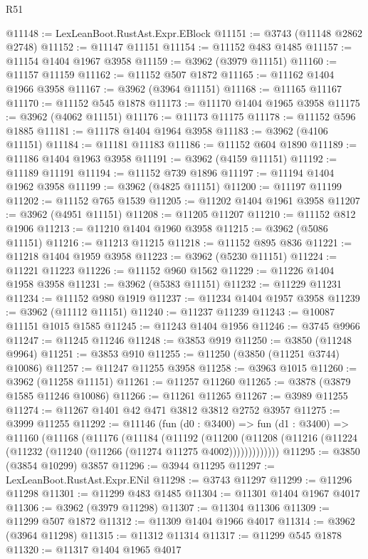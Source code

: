\begin{lexlean}{R51}
\begin{coremodule}
@11148 := LexLeanBoot.RustAst.Expr.EBlock
@11151 := @3743 (@11148 @2862 @2748)
@11152 := @11147 @11151
@11154 := @11152 @483 @1485
@11157 := @11154 @1404 @1967 @3958
@11159 := @3962 (@3979 @11151)
@11160 := @11157 @11159
@11162 := @11152 @507 @1872
@11165 := @11162 @1404 @1966 @3958
@11167 := @3962 (@3964 @11151)
@11168 := @11165 @11167
@11170 := @11152 @545 @1878
@11173 := @11170 @1404 @1965 @3958
@11175 := @3962 (@4062 @11151)
@11176 := @11173 @11175
@11178 := @11152 @596 @1885
@11181 := @11178 @1404 @1964 @3958
@11183 := @3962 (@4106 @11151)
@11184 := @11181 @11183
@11186 := @11152 @604 @1890
@11189 := @11186 @1404 @1963 @3958
@11191 := @3962 (@4159 @11151)
@11192 := @11189 @11191
@11194 := @11152 @739 @1896
@11197 := @11194 @1404 @1962 @3958
@11199 := @3962 (@4825 @11151)
@11200 := @11197 @11199
@11202 := @11152 @765 @1539
@11205 := @11202 @1404 @1961 @3958
@11207 := @3962 (@4951 @11151)
@11208 := @11205 @11207
@11210 := @11152 @812 @1906
@11213 := @11210 @1404 @1960 @3958
@11215 := @3962 (@5086 @11151)
@11216 := @11213 @11215
@11218 := @11152 @895 @836
@11221 := @11218 @1404 @1959 @3958
@11223 := @3962 (@5230 @11151)
@11224 := @11221 @11223
@11226 := @11152 @960 @1562
@11229 := @11226 @1404 @1958 @3958
@11231 := @3962 (@5383 @11151)
@11232 := @11229 @11231
@11234 := @11152 @980 @1919
@11237 := @11234 @1404 @1957 @3958
@11239 := @3962 (@11112 @11151)
@11240 := @11237 @11239
@11243 := @10087 @11151 @1015 @1585
@11245 := @11243 @1404 @1956
@11246 := @3745 @9966
@11247 := @11245 @11246
@11248 := @3853 @919
@11250 := @3850 (@11248 @9964)
@11251 := @3853 @910
@11255 := @11250 (@3850 (@11251 @3744) @10086)
@11257 := @11247 @11255 @3958
@11258 := @3963 @1015
@11260 := @3962 (@11258 @11151)
@11261 := @11257 @11260
@11265 := @3878 (@3879 @1585 @11246 @10086)
@11266 := @11261 @11265
@11267 := @3989 @11255
@11274 := @11267 @1401 @42 @471 @3812 @3812 @2752 @3957
@11275 := @3999 @11255
@11292 := @11146
    (fun (d0 : @3400) =>
    fun (d1 : @3400) =>
    @11160
      (@11168
        (@11176
          (@11184
            (@11192
              (@11200
                (@11208 (@11216 (@11224 (@11232 (@11240 (@11266 (@11274 @11275 @4002)))))))))))))
@11295 := @3850 (@3854 @10299) @3857
@11296 := @3944 @11295
@11297 := LexLeanBoot.RustAst.Expr.ENil
@11298 := @3743 @11297
@11299 := @11296 @11298
@11301 := @11299 @483 @1485
@11304 := @11301 @1404 @1967 @4017
@11306 := @3962 (@3979 @11298)
@11307 := @11304 @11306
@11309 := @11299 @507 @1872
@11312 := @11309 @1404 @1966 @4017
@11314 := @3962 (@3964 @11298)
@11315 := @11312 @11314
@11317 := @11299 @545 @1878
@11320 := @11317 @1404 @1965 @4017

\end{coremodule}
\end{lexlean}
